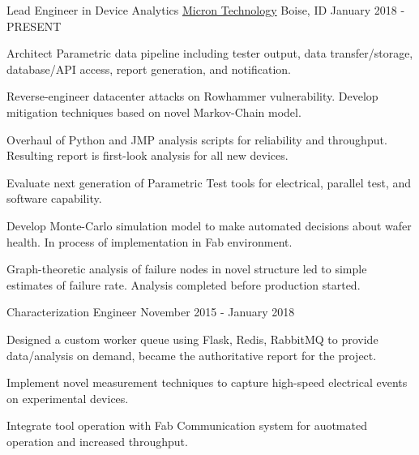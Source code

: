 

\begin{cventries}

  \cventry
    {Lead Engineer in Device Analytics} %
    {\href{https://www.micron.com}{Micron Technology}} %
    {Boise, ID} %
    {January 2018 - PRESENT} %
    {
      \begin{cvitems} %
        \item {Architect Parametric data pipeline including tester output, data transfer/storage, database/API access, report generation, and notification.}
        \item {Reverse-engineer datacenter attacks on Rowhammer vulnerability. Develop mitigation techniques based on novel Markov-Chain model.}
        \item {Overhaul of Python and JMP analysis scripts for reliability and throughput. Resulting report is first-look analysis for all new devices.}
        \item {Evaluate next generation of Parametric Test tools for electrical, parallel test, and software capability.}
        \item {Develop Monte-Carlo simulation model to make automated decisions about wafer health. In process of implementation in Fab environment.}
        \item {Graph-theoretic analysis of failure nodes in novel structure led to simple estimates of failure rate. Analysis completed before production started.}
      \end{cvitems}
    }

  \cventry
    {Characterization Engineer} %
    {} %
    {} %
    {November 2015 - January 2018} %
    {
      \begin{cvitems} %
        \item {Designed a custom worker queue using Flask, Redis, RabbitMQ to provide data/analysis on demand, became the authoritative report for the project.}
        \item {Implement novel measurement techniques to capture high-speed electrical events on experimental devices.}
        \item {Integrate tool operation with Fab Communication system for auotmated operation and increased throughput.}
      \end{cvitems}
    }


\end{cventries}
